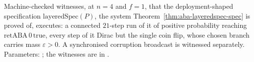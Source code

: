 \begin{definition}
  \label{def:aba-examples}
  \leanok
  Machine-checked witnesses, at $n = 4$ and $f = 1$, that the deployment-shaped specification $\mathrm{layeredSpec}(P)$, the system Theorem~\ref{thm:aba-layeredspec-spec} is proved of, executes: a connected $21$-step run of it of positive probability reaching $\mathrm{retABA}\,0\,\mathrm{true}$, every step of it Dirac but the single coin flip, whose chosen branch carries mass $\varepsilon > 0$.
  A synchronised corruption broadcast is witnessed separately.
  Parameters: ; the witnesses are in .
\end{definition}
